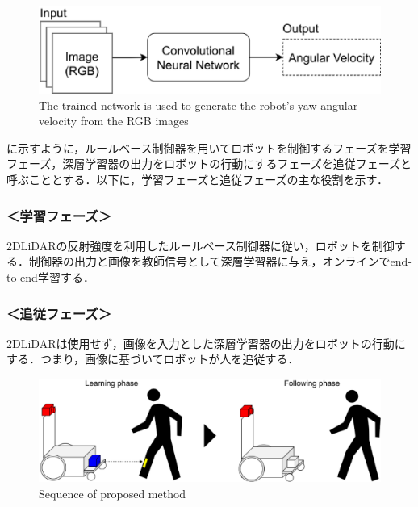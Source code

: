   \begin{figure}[h]
    \centering
    \includegraphics[keepaspectratio, scale=0.50] {images/eps/RobotGuidance_simple_system}
    \captionsetup{justification=raggedright} %
    \caption{The trained network is used to generate the robot's yaw angular velocity from the RGB images}
    \label{Fig:RobotGuidance_simple_system}
  \end{figure}

  に示すように，ルールベース制御器を用いてロボットを制御するフェーズを学習フェーズ，深層学習器の出力をロボットの行動にするフェーズを追従フェーズと呼ぶこととする．以下に，学習フェーズと追従フェーズの主な役割を示す．

  \subsubsection*{＜学習フェーズ＞}
  2DLiDARの反射強度を利用したルールベース制御器に従い，ロボットを制御する．制御器の出力と画像を教師信号として深層学習器に与え，オンラインでend-to-end学習する．
  
  \subsubsection*{＜追従フェーズ＞}
  2DLiDARは使用せず，画像を入力とした深層学習器の出力をロボットの行動にする．つまり，画像に基づいてロボットが人を追従する．

  \begin{figure}[h]
    \centering
    \includegraphics[keepaspectratio, scale=0.35] {images/eps/RobotGuidance_all_system}
    \captionsetup{justification=raggedright} %
    \caption{Sequence of proposed method}
    \label{Fig:RobotGuidance_all_system}
  \end{figure}

\newpage
